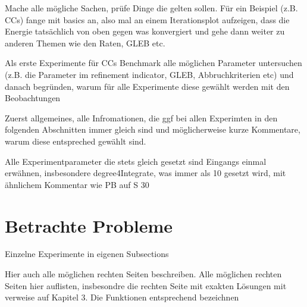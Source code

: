 Mache alle mögliche Sachen, prüfe Dinge die gelten sollen. Für ein
Beispiel (z.B. CCs) fange mit basics an, also mal an einem Iterationsplot
aufzeigen, dass die Energie tatsächlich von oben gegen was konvergiert und 
gehe dann weiter zu anderen Themen wie den Raten, GLEB etc.




\bigskip
Als erste Experimente für CCs Benchmark alle möglichen Parameter untersuchen 
(z.B. die Parameter im refinement indicator, GLEB, Abbruchkriterien etc)
und danach begründen, warum für alle Experimente diese gewählt werden mit
den Beobachtungen

\bigskip


Zuerst allgemeines, alle Infromationen, die ggf bei allen Experimten in den 
folgenden Abschnitten immer gleich sind und möglicherweise kurze Kommentare,
warum diese entspreched gewählt sind.

\bigskip

Alle Experimentparameter die stets gleich gesetzt sind Eingangs einmal erwähnen,
insbesondere degree4Integrate, was immer als 10 gesetzt wird, mit ähnlichem 
Kommentar wie PB auf S 30

\section{Betrachte Probleme}
Einzelne Experimente in eigenen Subsections
\bigskip

Hier auch alle möglichen rechten Seiten beschreiben.
Alle möglichen rechten Seiten hier auflisten, insbesondre die rechten 
Seite mit exakten Lösungen mit verweise auf Kapitel 3.
Die Funktionen entsprechend bezeichnen

